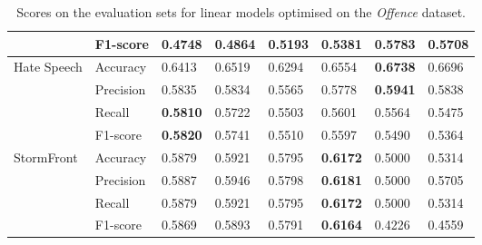 \begin{table}[]
\begin{minipage}{0.42\paperheight}
{\begin{tabular}{ll|ll|ll|ll}
                                        & F1-score  & 0.4748      & 0.4864       & 0.5193 & 0.5381          & \bf{0.5783} & 0.5708      \\ \hline
      \multirow{4}{*}{Hate Speech}      & Accuracy  & 0.6413      & 0.6519       & 0.6294 & 0.6554          & \bf{0.6738} & 0.6696      \\
                                        & Precision & 0.5835      & 0.5834       & 0.5565 & 0.5778          & \bf{0.5941} & 0.5838      \\
                                        & Recall    & \bf{0.5810} & 0.5722       & 0.5503 & 0.5601          & 0.5564      & 0.5475      \\
                                        & F1-score  & \bf{0.5820} & 0.5741       & 0.5510 & 0.5597          & 0.5490      & 0.5364      \\ \hline
      \multirow{4}{*}{StormFront}       & Accuracy  & 0.5879      & 0.5921       & 0.5795 & \bf{0.6172}     & 0.5000      & 0.5314      \\
                                        & Precision & 0.5887      & 0.5946       & 0.5798 & \bf{0.6181}     & 0.5000      & 0.5705      \\
                                        & Recall    & 0.5879      & 0.5921       & 0.5795 & \bf{0.6172}     & 0.5000      & 0.5314      \\
                                        & F1-score  & 0.5869      & 0.5893       & 0.5791 & \bf{0.6164}     & 0.4226      & 0.4559
    \end{tabular}%
    }
    \caption{Scores on the evaluation sets for linear models optimised on the \textit{Offence} dataset.}
    \label{tab:linear_offence_baselines}
    \vfill
\end{minipage}
\end{table}
